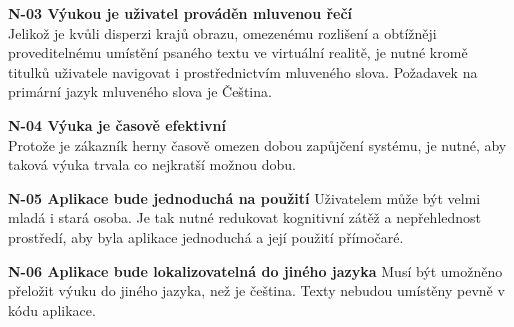 \textbf{N-03 Výukou je uživatel prováděn mluvenou řečí}\\
Jelikož je kvůli disperzi krajů obrazu, omezenému rozlišení a obtížněji
proveditelnému umístění psaného textu ve virtuální realitě, je nutné
kromě titulků uživatele navigovat i prostřednictvím mluveného slova.
Požadavek na primární jazyk mluveného slova je Čeština.

\textbf{N-04 Výuka je časově efektivní}\\
Protože je zákazník herny časově omezen dobou zapůjčení systému, je
nutné, aby taková výuka trvala co nejkratší možnou dobu.

\textbf{N-05 Aplikace bude jednoduchá na použití} Uživatelem může být
velmi mladá i stará osoba. Je tak nutné redukovat kognitivní zátěž a
nepřehlednost prostředí, aby byla aplikace jednoduchá a její použití
přímočaré.

\textbf{N-06 Aplikace bude lokalizovatelná do jiného jazyka} Musí být
umožněno přeložit výuku do jiného jazyka, než je čeština. Texty nebudou
umístěny pevně v kódu aplikace.
